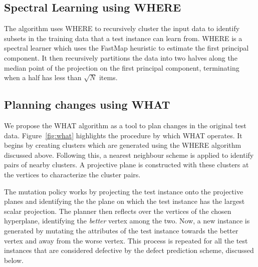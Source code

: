 \documentclass[conference]{IEEEtran}
\begin{document}
\subsection{Spectral Learning using WHERE}
The algorithm uses WHERE to recursively cluster the input data to identify subsets in the training data that a test instance can learn from. WHERE is a spectral learner which uses the FastMap heuristic to estimate the first principal component. It then recursively partitions the data into two halves along the median point of the projection on the first principal component, terminating when a half has less than $\sqrt{N}$ items.   

\subsection{Planning changes using WHAT}
We propose the WHAT algorithm as a tool to plan changes in the original test data. Figure~\ref{fig:what} highlights the procedure by which WHAT operates. It begins by creating clusters which are generated using the WHERE algorithm discussed above. Following this, a nearest neighbour scheme is applied to identify pairs of nearby clusters. A projective plane is constructed with these clusters at the vertices to characterize the cluster pairs.

The mutation policy works by projecting the test instance onto the projective planes and identifying the the plane on which the test instance has the largest scalar projection. The planner then reflects over the vertices of the chosen hyperplane, identifying the \textit{better} vertex among the two. Now, a new instance is generated by mutating the attributes of the test instance towards the better vertex and away from the worse vertex. This process is repeated for all the test instances that are considered defective by the defect prediction scheme, discussed below.
\end{document}
